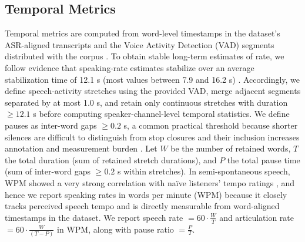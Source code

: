 \documentclass{Interspeech}
\begin{document}
\subsection{Temporal Metrics}\label{sec:temporalmetrics}
Temporal metrics are computed from word-level timestamps in the dataset's ASR-aligned transcripts and the Voice Activity Detection (VAD) segments distributed with the corpus \cite{seamless_interaction}. 
To obtain stable long-term estimates of rate, we follow evidence that speaking-rate estimates stabilize over an average stabilization time of 12.1 s (most values between 7.9 and 16.2 s) \cite{arantes2018minimum}. 
Accordingly, we define speech-activity stretches using the provided VAD, merge adjacent segments separated by at most 1.0 s, and retain only continuous stretches with duration $\geq 12.1$ s before computing speaker-channel-level temporal statistics. 
We define pauses as inter-word gaps $\geq 0.2$ s, a common practical threshold because shorter silences are difficult to distinguish from stop closures and their inclusion increases annotation and measurement burden \cite{campione2002large}. 
Let $W$ be the number of retained words, $T$ the total duration (sum of retained stretch durations), and $P$ the total pause time (sum of inter-word gaps $\geq 0.2$ s within stretches). 
In semi-spontaneous speech, WPM showed a very strong correlation with naïve listeners' tempo ratings \cite{iwarsson2023measuring}, and hence we report speaking rates in words per minute (WPM) because it closely tracks perceived speech tempo and is directly measurable from word-aligned timestamps in the dataset.
We report speech rate $=60\cdot \frac{W}{T}$ and articulation rate $=60\cdot \frac{W}{(T-P)}$ \cite{goldman1956determinants} in WPM, along with pause ratio $=\frac{P}{T}$.
\end{document}
